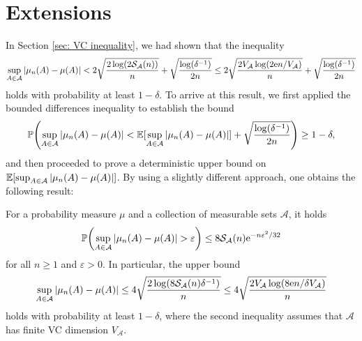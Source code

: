 \section{Extensions}

In Section \ref{sec: VC inequality}, we had shown that the inequality
\[
    \sup_{A \in \mathcal{A}} \abs{\mu_n(A) - \mu(A)} < 2 \sqrt{\frac{2 \log(2 \mathcal{S}_{\mathcal{A}}(n))}{n}} + \sqrt{\frac{\log(\delta^{-1})}{2n}} \leq 2 \sqrt{\frac{2 V_{\mathcal{A}} \log(2 \mathrm{e} n / V_{\mathcal{A}})}{n}} + \sqrt{\frac{\log(\delta^{-1})}{2n}}
\]
holds with probability at least $1 - \delta$. To arrive at this result, we first applied the bounded differences inequality to establish the bound
\[
    \Prob\left(\sup_{A \in \mathcal{A}} \abs{\mu_n(A) - \mu(A)} < \Exp[\sup_{A \in \mathcal{A}} \abs{\mu_n(A) - \mu(A)}] + \sqrt{\frac{\log(\delta^{-1})}{2n}}\right) \geq 1 - \delta,
\]
and then proceeded to prove a deterministic upper bound on $\operatorname{\mathbb{E}}[\sup_{A \in \mathcal{A}} \abs{\mu_n(A) - \mu(A)}]$. By using a slightly different approach, one obtains the following result:

\begin{theorem}
\label{thm: VC inequality (2nd version)}
For a probability measure $\mu$ and a collection of measurable sets $\mathcal{A}$, it holds
\[
    \Prob\left(\sup_{A \in \mathcal{A}} \abs{\mu_n(A) - \mu(A)} > \varepsilon\right) \leq 8 \mathcal{S}_{\mathcal{A}}(n) \e^{-n \varepsilon^2 / 32}
\]
for all $n \geq 1$ and $\varepsilon > 0$. In particular, the upper bound
\[
    \sup_{A \in \mathcal{A}} \abs{\mu_n(A) - \mu(A)} \leq 4 \sqrt{\frac{2 \log(8 \mathcal{S}_{\mathcal{A}}(n) \delta^{-1})}{n}} \leq 4 \sqrt{\frac{2 V_{\mathcal{A}} \log(8 \mathrm{e} n / \delta V_{\mathcal{A}})}{n}}
\]
holds with probability at least $1 - \delta$, where the second inequality assumes that $\mathcal{A}$ has finite VC dimension $V_{\mathcal{A}}$.
\end{theorem}

